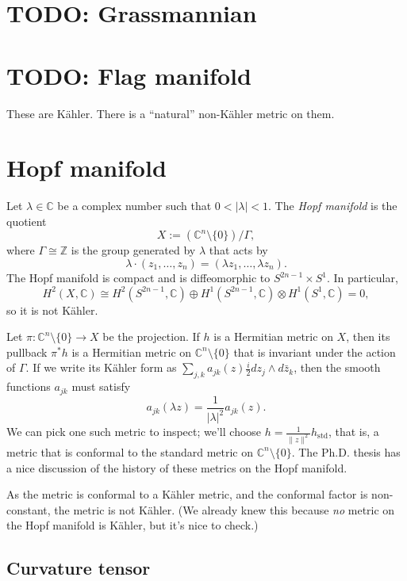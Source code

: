 \documentclass[11pt]{article}
\newcommand{\kk}[1]{\mathbb{#1}}
\begin{document}
\section{TODO: Grassmannian}
\label{sec:org34425b6}

\section{TODO: Flag manifold}
\label{sec:orga0ef6a0}

These are K\"ahler. There is a ``natural'' non-K\"ahler metric on them.

\section{Hopf manifold}
\label{sec:org8f5818e}

Let \(\lambda \in \kk C\) be a complex number such that \(0 < |\lambda| < 1\). The \emph{Hopf manifold} is the quotient
$$
X := (\kk C^n \setminus \{0\}) / \Gamma,
$$
where \(\Gamma \cong \kk Z\) is the group generated by \(\lambda\) that acts by
$$
\lambda \cdot (z_1, \ldots, z_n) = (\lambda z_1, \ldots, \lambda z_n).
$$
The Hopf manifold is compact and is diffeomorphic to \(S^{2n-1} \times S^1\). In particular,
$$
H^2(X, \kk C) \cong H^2(S^{2n-1}, \kk C) \oplus H^1(S^{2n-1}, \kk C) \otimes H^1(S^1, \kk C) = 0,
$$
so it is not K\"ahler.

Let \(\pi : \kk C^n \setminus \{0\} \to X\) be the projection. If \(h\) is a Hermitian metric on \(X\), then its pullback \(\pi^*h\) is a Hermitian metric on \(\kk C^n \setminus \{0\}\) that is invariant under the action of \(\Gamma\). If we write its K\"ahler form as \(\sum_{j,k} a_{jk}(z) \tfrac{i}{2} dz_j \wedge d\bar z_k\), then the smooth functions \(a_{jk}\) must satisfy
$$
a_{jk}(\lambda z) = \frac{1}{|\lambda|^2} a_{jk}(z).
$$
We can pick one such metric to inspect; we'll choose \(h = \frac{1}{\|z\|^2} h_{\mathrm{std}}\), that is, a metric that is conformal to the standard metric on \(\kk C^n \setminus \{0\}\). The Ph.D. thesis \cite{istrati:tel-02156198} has a nice discussion of the history of these metrics on the Hopf manifold.

As the metric is conformal to a K\"ahler metric, and the conformal factor is non-constant, the metric is not K\"ahler. (We already knew this because \emph{no} metric on the Hopf manifold is K\"ahler, but it's nice to check.)


\subsection{Curvature tensor}
\label{sec:org96d544d}
\end{document}
